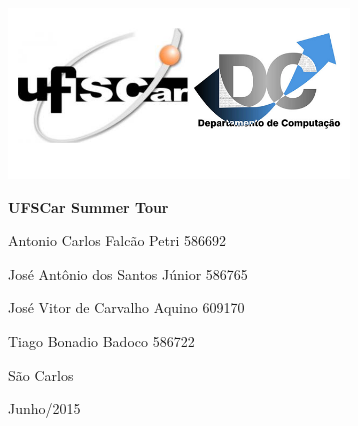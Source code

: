 \documentclass[a4paper]{article}
\date{}
\begin{document}
\clearpage\setcounter{page}{1}\pagestyle{Standard}
{\centering 
\includegraphics[width=3.5693in,height=1.7807in]{UFSCar20Summer20Tour-img/UFSCar20Summer20Tour-img1.png}
\par}


\bigskip


\bigskip


\bigskip


\bigskip

{\centering\color{black}
\textbf{UFSCar Summer Tour}
\par}


\bigskip


\bigskip


\bigskip


\bigskip

{\raggedleft\color{black}
Antonio Carlos Falcão Petri 586692
\par}

{\raggedleft\color{black}
José Antônio dos Santos Júnior 586765
\par}

{\raggedleft\color{black}
José Vitor de Carvalho Aquino 609170
\par}

{\raggedleft\color{black}
Tiago Bonadio Badoco 586722
\par}


\bigskip


\bigskip


\bigskip


\bigskip


\bigskip


\bigskip


\bigskip


\bigskip


\bigskip


\bigskip


\bigskip


\bigskip

{\centering\color{black}
São Carlos
\par}

{\centering\color{black}
Junho/2015
\par}
\end{document}
